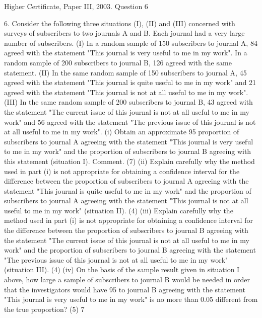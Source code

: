 \documentclass[a4paper,12pt]{article}
\begin{document}
Higher Certificate, Paper III, 2003. Question 6


\begin{framed}
6.
Consider the following three situations (I), (II) and (III) concerned with surveys of
subscribers to two journals A and B. Each journal had a very large number of
subscribers.
(I)
In a random sample of 150 subscribers to journal A, 84 agreed with the
statement "This journal is very useful to me in my work". In a random sample of 200
subscribers to journal B, 126 agreed with the same statement.
(II)
In the same random sample of 150 subscribers to journal A, 45 agreed with the
statement "This journal is quite useful to me in my work" and 21 agreed with the
statement "This journal is not at all useful to me in my work".
(III) In the same random sample of 200 subscribers to journal B, 43 agreed with the
statement "The current issue of this journal is not at all useful to me in my work" and
56 agreed with the statement "The previous issue of this journal is not at all useful to
me in my work".
(i) Obtain an approximate 95%
proportion of subscribers to journal A agreeing with the statement "This
journal is very useful to me in my work" and the proportion of subscribers to
journal B agreeing with this statement (situation I). Comment.
(7)
(ii) Explain carefully why the method used in part (i) is not appropriate for
obtaining a confidence interval for the difference between the proportion of
subscribers to journal A agreeing with the statement "This journal is quite
useful to me in my work" and the proportion of subscribers to journal A
agreeing with the statement "This journal is not at all useful to me in my work"
(situation II).
(4)
(iii) Explain carefully why the method used in part (i) is not appropriate for
obtaining a confidence interval for the difference between the proportion of
subscribers to journal B agreeing with the statement "The current issue of this
journal is not at all useful to me in my work" and the proportion of subscribers
to journal B agreeing with the statement "The previous issue of this journal is
not at all useful to me in my work" (situation III).
(4)
(iv) On the basis of the sample result given in situation I above, how large a sample
of subscribers to journal B would be needed in order that the investigators
would have 95%
to journal B agreeing with the statement "This journal is very useful to me in
my work" is no more than 0.05 different from the true proportion?
(5)
7

\end{framed}
\end{document}
